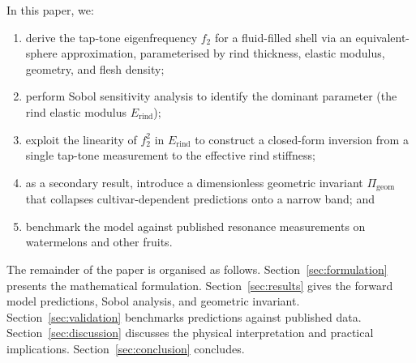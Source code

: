 In this paper, we:
\begin{enumerate}
  \item derive the tap-tone eigenfrequency $f_2$ for a fluid-filled
    shell via an equivalent-sphere approximation, parameterised by rind
    thickness, elastic modulus, geometry, and flesh density;
  \item perform Sobol sensitivity analysis to identify the dominant
    parameter (the rind elastic modulus $E_{\mathrm{rind}}$);
  \item exploit the linearity of $f_2^2$ in $E_{\mathrm{rind}}$ to
    construct a closed-form inversion from a single tap-tone measurement
    to the effective rind stiffness;
  \item as a secondary result, introduce a dimensionless geometric
    invariant $\Pi_{\mathrm{geom}}$ that collapses cultivar-dependent
    predictions onto a narrow band; and
  \item benchmark the model against published resonance measurements on
    watermelons and other fruits.
\end{enumerate}

The remainder of the paper is organised as follows.
Section~\ref{sec:formulation} presents the mathematical formulation.
Section~\ref{sec:results} gives the forward model predictions, Sobol
analysis, and geometric invariant.  Section~\ref{sec:validation}
benchmarks predictions against published data.
Section~\ref{sec:discussion}
discusses the physical interpretation and practical implications.
Section~\ref{sec:conclusion} concludes.
